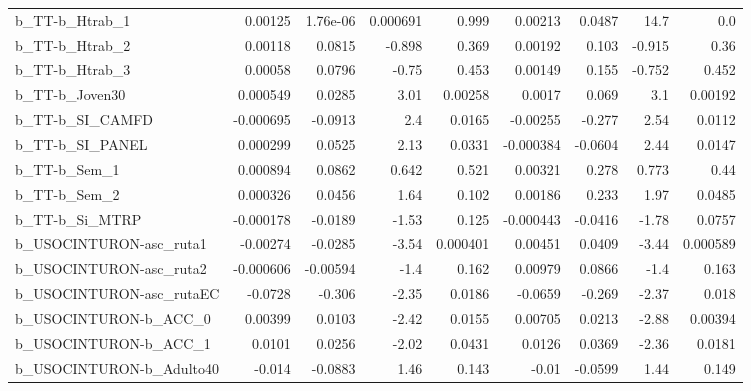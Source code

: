 \begin{tabular}{lrrrrrrrr}
b\_TT-b\_Htrab\_1             &     0.00125 &     1.76e-06 &  0.000691 &    0.999 &    0.00213 &      0.0487 &         14.7 &           0.0 \\
b\_TT-b\_Htrab\_2             &     0.00118 &       0.0815 &    -0.898 &    0.369 &    0.00192 &       0.103 &       -0.915 &          0.36 \\
b\_TT-b\_Htrab\_3             &     0.00058 &       0.0796 &     -0.75 &    0.453 &    0.00149 &       0.155 &       -0.752 &         0.452 \\
b\_TT-b\_Joven30             &    0.000549 &       0.0285 &      3.01 &  0.00258 &     0.0017 &       0.069 &          3.1 &       0.00192 \\
b\_TT-b\_SI\_CAMFD            &   -0.000695 &      -0.0913 &       2.4 &   0.0165 &   -0.00255 &      -0.277 &         2.54 &        0.0112 \\
b\_TT-b\_SI\_PANEL            &    0.000299 &       0.0525 &      2.13 &   0.0331 &  -0.000384 &     -0.0604 &         2.44 &        0.0147 \\
b\_TT-b\_Sem\_1               &    0.000894 &       0.0862 &     0.642 &    0.521 &    0.00321 &       0.278 &        0.773 &          0.44 \\
b\_TT-b\_Sem\_2               &    0.000326 &       0.0456 &      1.64 &    0.102 &    0.00186 &       0.233 &         1.97 &        0.0485 \\
b\_TT-b\_Si\_MTRP             &   -0.000178 &      -0.0189 &     -1.53 &    0.125 &  -0.000443 &     -0.0416 &        -1.78 &        0.0757 \\
b\_USOCINTURON-asc\_ruta1    &    -0.00274 &      -0.0285 &     -3.54 & 0.000401 &    0.00451 &      0.0409 &        -3.44 &      0.000589 \\
b\_USOCINTURON-asc\_ruta2    &   -0.000606 &     -0.00594 &      -1.4 &    0.162 &    0.00979 &      0.0866 &         -1.4 &         0.163 \\
b\_USOCINTURON-asc\_rutaEC   &     -0.0728 &       -0.306 &     -2.35 &   0.0186 &    -0.0659 &      -0.269 &        -2.37 &         0.018 \\
b\_USOCINTURON-b\_ACC\_0      &     0.00399 &       0.0103 &     -2.42 &   0.0155 &    0.00705 &      0.0213 &        -2.88 &       0.00394 \\
b\_USOCINTURON-b\_ACC\_1      &      0.0101 &       0.0256 &     -2.02 &   0.0431 &     0.0126 &      0.0369 &        -2.36 &        0.0181 \\
b\_USOCINTURON-b\_Adulto40   &      -0.014 &      -0.0883 &      1.46 &    0.143 &      -0.01 &     -0.0599 &         1.44 &         0.149 \\

\end{tabular}
